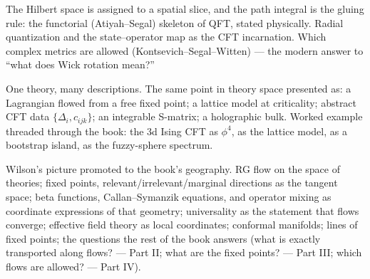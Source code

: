 The Hilbert space is assigned to a spatial slice, and the path integral is the gluing rule: the functorial (Atiyah--Segal) skeleton of QFT, stated physically. Radial quantization and the state--operator map as the CFT incarnation. Which complex metrics are allowed (Kontsevich--Segal--Witten) --- the modern answer to ``what does Wick rotation mean?''

One theory, many descriptions. The same point in theory space presented as: a Lagrangian flowed from a free fixed point; a lattice model at criticality; abstract CFT data $\{\Delta_i, c_{ijk}\}$; an integrable S-matrix; a holographic bulk. Worked example threaded through the book: the 3d Ising CFT as $\phi^4$, as the lattice model, as a bootstrap island, as the fuzzy-sphere spectrum.

Wilson's picture promoted to the book's geography. RG flow on the space of theories; fixed points, relevant/irrelevant/marginal directions as the tangent space; beta functions, Callan--Symanzik equations, and operator mixing as coordinate expressions of that geometry; universality as the statement that flows converge; effective field theory as local coordinates; conformal manifolds; lines of fixed points; the questions the rest of the book answers (what is exactly transported along flows? --- Part II; what are the fixed points? --- Part III; which flows are allowed? --- Part IV).


